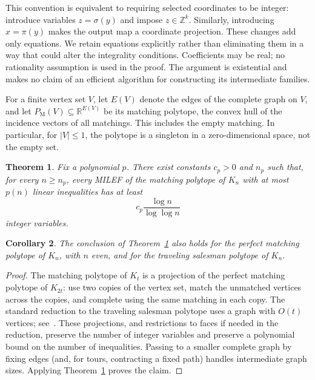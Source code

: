 \documentclass[11pt]{article}
\newtheorem{theorem}{Theorem}
\newtheorem{corollary}[theorem]{Corollary}
\theoremstyle{definition}
\newcommand{\R}{\mathbb R}
\newcommand{\Z}{\mathbb Z}
\newcommand{\PM}{P_{\mathrm M}}
\begin{document}
This convention is equivalent to requiring selected coordinates to be integer:
introduce variables $z=\sigma(y)$ and impose $z\in\Z^k$. Similarly, introducing
$x=\pi(y)$ makes the output map a coordinate projection. These changes add
only equations. We retain equations explicitly rather than eliminating them
in a way that could alter the integrality conditions. Coefficients may be real;
no rationality assumption is used in the proof. The argument is existential
and makes no claim of an efficient algorithm for constructing its intermediate
families.

For a finite vertex set $V$, let $E(V)$ denote the edges of the complete graph
on $V$, and let $\PM(V)\subseteq\R^{E(V)}$ be its matching polytope, the
convex hull of the incidence vectors of all matchings. This includes the empty
matching. In particular, for $|V|\leq1$, the polytope is a singleton in a
zero-dimensional space, not the empty set.

\begin{theorem}\label{thm:main}
Fix a polynomial $p$. There exist constants $c_p>0$ and $n_p$ such that, for
every $n\geq n_p$, every MILEF of the matching polytope of $K_n$ with at most
$p(n)$ linear inequalities has at least
\[
 c_p\frac{\log n}{\log\log n}
\]
integer variables.
\end{theorem}

\begin{corollary}\label{cor:other}
The conclusion of Theorem~\ref{thm:main} also holds for the perfect matching
polytope of $K_n$, with $n$ even, and for the traveling salesman polytope of
$K_n$.
\end{corollary}

\begin{proof}
The matching polytope of $K_t$ is a projection of the perfect matching polytope
of $K_{2t}$: use two copies of the vertex set, match the unmatched vertices
across the copies, and complete using the same matching in each copy.
The standard reduction to the traveling salesman polytope uses a graph with
$O(t)$ vertices; see~\cite{yannakakis_1991_expressing,rothvoss_2014_matching}.
These projections, and restrictions to faces if needed in the reduction,
preserve the number of integer variables and preserve a polynomial bound
on the number of inequalities. Passing to a smaller complete graph by fixing
edges (and, for tours, contracting a fixed path) handles intermediate graph
sizes. Applying Theorem~\ref{thm:main} proves the claim.
\end{proof}
\end{document}
